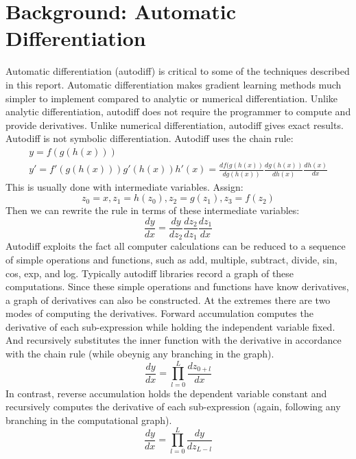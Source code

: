 \documentclass[]{article}
\begin{document}
\section{Background: Automatic Differentiation}
Automatic differentiation (autodiff) is critical to some of the techniques described in this report.  Automatic differentiation makes gradient learning methods much simpler to implement compared to analytic or numerical differentiation.  Unlike analytic differentiation, autodiff does not require the programmer to compute and provide derivatives.  Unlike numerical differentiation, autodiff gives exact results.  Autodiff is not symbolic differentiation.  Autodiff uses the chain rule:
\begin{gather}
	y = f(g(h(x)))\\
	y' = f'(g(h(x)))g'(h(x))h'(x) = \frac{df(g(h(x))}{dg(h(x))} \frac{dg(h(x))}{dh(x)} \frac{dh(x)}{dx}
\end{gather}
This is usually done with intermediate variables.  Assign:
\begin{equation}
	z_0 = x, z_1 = h(z_0), z_2 = g(z_1), z_3 = f(z_2)
\end{equation}
Then we can rewrite the rule in terms of these intermediate variables:
\begin{equation}
	\frac{dy}{dx} = \frac{dy}{dz_2} \frac{dz_2}{dz_1} \frac{dz_1}{dx} 
\end{equation}
Autodiff exploits the fact all computer calculations can be reduced to a sequence of simple operations and functions, such as add, multiple, subtract, divide, sin, cos, exp, and log.  Typically autodiff libraries record a graph of these computations.  Since these simple operations and functions have know derivatives, a graph of derivatives can also be constructed.  At the extremes there are two modes of computing the derivatives.  Forward accumulation computes the derivative of each sub-expression while holding the independent variable fixed.  And recursively substitutes the inner function with the derivative in accordance with the chain rule (while obeynig any branching in the graph).
\begin{equation}
	\frac{dy}{dx} = \prod_{l=0}^{L}\frac{dz_{0+l}}{dx}
\end{equation}
In contrast, reverse accumulation holds the dependent variable constant and recursively computes the derivative of each sub-expression (again, following any branching in the computational graph). 
\begin{equation}
	\frac{dy}{dx} = \prod_{l=0}^{L}\frac{dy}{dz_{L-l}}
\end{equation}
\end{document}
